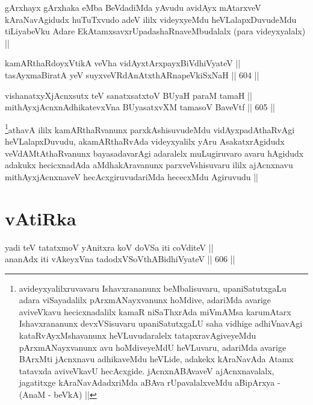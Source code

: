 \begin{artha}
gArxhayx gArxhaka eMba BeVdadiMda yAvudu avidAyx mAtarxveV
kAraNavAgidudx huTuTxvudo adeV ililx videyxyeMdu heVLalapxDuvudeMdu
tiLiyabeVku Adare EkAtamxsavxrUpadashaRnaveMbudalalx (para
videyxyalalx) ||
\end{artha}


\begin{shl}
kamARthaRdoyxVtikA veVha vidAyx\s tArxpayxBiVdhiVyateV || \\
tasAyxmaBiratA yeV suyxveVRdAnAtxthARnapeVkiSxNaH ||  604 ||  
\end{shl}
				
\begin{shl}
vishanatxyXjAcnxsutx teV sanatxsatxtoV BUyaH paraM tamaH || \\
mithAyxjAcnxnAdhikatevxVna BUyasatxvXM tamasoV BaveVtf ||  605 ||  
\end{shl}

\begin{artha}
\footnote{avideyxyalilxruvavaru Ishavxrananunx beMbalisuvaru,
  upaniSatutxgaLu adara viSayadalilx pArxmANayxvanunx hoMdive,
  adariMda avarige aviveVkavu hecicxnadalilx kamaR niSaThxrAda
  miVmAMsa karumAtarx Ishavxrananunx devxVSisuvaru upaniSatutxgaLU
  saha vidhige adhiVnavAgi kataRvAyxMshavanunx heVLuvudaralelx
  tatapxravAgiveyeMdu pArxmANayxvanunx avu hoMdiveyeMdU heVLuvaru,
  adariMda avarige BArxMti jAcnxnavu adhikaveMdu heVLide, adakekx
  kAraNavAda Atamx tatavxda aviveVkavU hecAcxgide. jAcnxnABAvaveV
  ajAcnxnavalalx, jagatitxge kAraNavAdadxriMda aBAva rUpavalalxveMdu
  aBipArxya - (AnaM - beVkA) ||}athavA ililx kamARthaRvanunx parxkAshisuvudeMdu vidAyxpadAthaRvAgi
heVLalapxDuvudu, akamARthaRvAda videyxyalilx yAru AsakatxrAgidudx
veVdAMtAthaRvanunx bayasadavarAgi adaralelx  muLugiruvaro avaru
hAgidudx adakukx hecicxnadAda aMdhakAravanunx parxveVshisuvaru ililx
ajAcnxnavu mithAyxjAcnxnaveV hecAcxgiruvudariMda hececxMdu Agiruvudu ||
\end{artha}

\section*{vAtiRka}

\begin{shl}
yadi teV tatatxmoV yAnitxra koV doVSa iti coVditeV || \\
ananAdx iti vAkeyxVna tadodxVSoV\s thABidhiVyateV ||  606 ||  
\end{shl}

